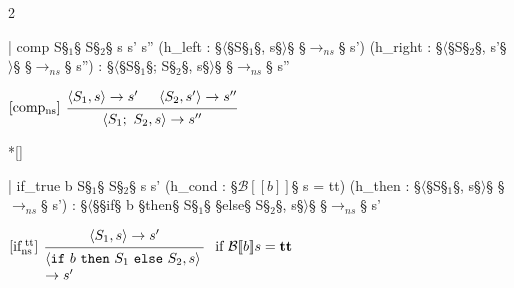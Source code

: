 \begin{paracol}{2}
\begin{leftcolumn}
    \begin{Lean_Code}
  | comp {S§$_{1}$§ S§$_{2}$§ s s' s''}
    (h_left  : §\(\langle\)§S§\(_1\)§, s§\(\rangle\)§ §\(\to_{ns}\)§ s')
    (h_right :
      §\(\langle\)§S§\(_2\)§, s'§\(\rangle\)§ §\(\to_{ns}\)§ s'') :
      §\(\langle\)§S§\(_1\)§; S§\(_2\)§, s§\(\rangle\)§ §\(\to_{ns}\)§ s''
    \end{Lean_Code}
\end{leftcolumn}
\begin{rightcolumn}
\vspace{3.6em}
    \(
\begin{prooftree}
  \hypo{\langle S_1, s \rangle \to s'}
  \hypo{\langle S_2, s' \rangle \to s''}
  \infer[
    left label=[comp$_{\text{ns}}$]
    ]2{
        \langle S_1;\ S_2, s \rangle \to s''
    }
\end{prooftree}
    \)
\end{rightcolumn}
\vspace{3em}


\switchcolumn[1]*[]
\begin{leftcolumn}
    \begin{Lean_Code}
  | if_true {b S§$_{1}$§ S§$_{2}$§ s s'}
    (h_cond : §\(\mathcal{B}[\![b]\!]\)§ s = tt)
    (h_then : §\(\langle\)§S§\(_1\)§, s§\(\rangle\)§ §\(\to_{ns}\)§ s') :
    §\(\langle\)§§if§ b §then§ S§$_{1}$§ §else§ S§$_{2}$§, s§\(\rangle\)§
    §\(\to_{ns}\)§ s'
    \end{Lean_Code}
\end{leftcolumn}

\begin{rightcolumn}
\vspace{2.5em}
    \(
\begin{prooftree}
  \hypo{\langle S_1, s \rangle \to s'}
  \infer[
    left label={[if$_{\text{ns}}^{\text{\ tt}}$]}
    ]1[
    if $\mathcal{B}[\![b]\!]s = \mathbf{tt}$
    ]{
        \parbox{4cm}{$
    \langle \mathtt{if}\ b\ \mathtt{then}\ S_1\ \mathtt{else}\ S_2, s \rangle \\
    \to s'
        $}
    }
\end{prooftree}
    \)
\end{rightcolumn}
\newpage


\end{paracol}

